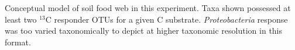 Conceptual model of soil food web in this experiment. Taxa shown possessed at least two $^{13}$C responder OTUs for a given C substrate. \textit{Proteobacteria} response was too varied taxonomically to depict at higher taxonomic resolution in this format.